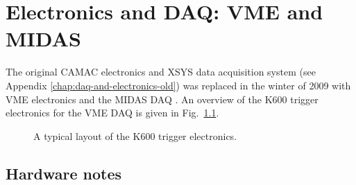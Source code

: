 \documentclass[11pt]{report}
\begin{document}
 




\chapter{Electronics and DAQ: VME and MIDAS}\label{chap:daq-and-electronics-new}
 
The original CAMAC electronics and XSYS data acquisition system (see Appendix \ref{chap:daq-and-electronics-old})
was replaced in the winter of 2009 with VME electronics and the MIDAS DAQ \cite{Mid}. 
An overview of the K600 trigger electronics for the VME DAQ is given in 
Fig.~\ref{fig:k600-electronics-newdaq}.

\begin{figure}[!ht]
\centerline{\vspace{0cm}\hspace{0cm}
}
\centering
\caption{A typical layout of the K600 trigger electronics.}
\label{fig:k600-electronics-newdaq}
\end{figure} 

\section{Hardware notes}
\end{document}

